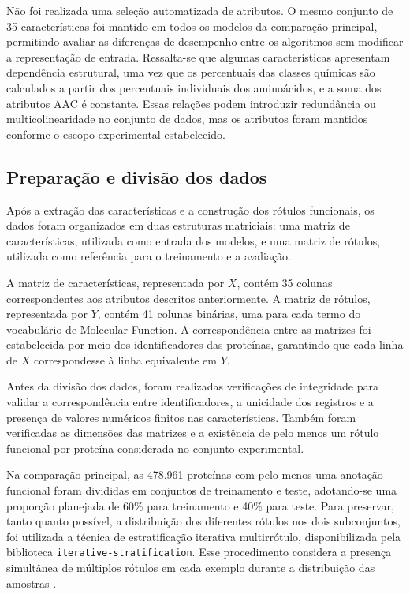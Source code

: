 Não foi realizada uma seleção automatizada de atributos. O mesmo conjunto de 35 características foi mantido em todos os modelos da comparação principal, permitindo avaliar as diferenças de desempenho entre os algoritmos sem modificar a representação de entrada. Ressalta-se que algumas características apresentam dependência estrutural, uma vez que os percentuais das classes químicas são calculados a partir dos percentuais individuais dos aminoácidos, e a soma dos atributos AAC é constante. Essas relações podem introduzir redundância ou multicolinearidade no conjunto de dados, mas os atributos foram mantidos conforme o escopo experimental estabelecido.


\subsection{Preparação e divisão dos dados}
\label{subsec:preparacao_divisao}

Após a extração das características e a construção dos rótulos funcionais, os dados foram organizados em duas estruturas matriciais: uma matriz de características, utilizada como entrada dos modelos, e uma matriz de rótulos, utilizada como referência para o treinamento e a avaliação.

A matriz de características, representada por $X$, contém 35 colunas correspondentes aos atributos descritos anteriormente. A matriz de rótulos, representada por $Y$, contém 41 colunas binárias, uma para cada termo do vocabulário de Molecular Function. A correspondência entre as matrizes foi estabelecida por meio dos identificadores das proteínas, garantindo que cada linha de $X$ correspondesse à linha equivalente em $Y$.

Antes da divisão dos dados, foram realizadas verificações de integridade para validar a correspondência entre identificadores, a unicidade dos registros e a presença de valores numéricos finitos nas características. Também foram verificadas as dimensões das matrizes e a existência de pelo menos um rótulo funcional por proteína considerada no conjunto experimental.

Na comparação principal, as 478.961 proteínas com pelo menos uma anotação funcional foram divididas em conjuntos de treinamento e teste, adotando-se uma proporção planejada de 60\% para treinamento e 40\% para teste. Para preservar, tanto quanto possível, a distribuição dos diferentes rótulos nos dois subconjuntos, foi utilizada a técnica de estratificação iterativa multirrótulo, disponibilizada pela biblioteca \texttt{iterative-stratification}. Esse procedimento considera a presença simultânea de múltiplos rótulos em cada exemplo durante a distribuição das amostras \cite{sechidis2011}.

